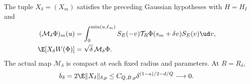 \begin{proposition}
  \label{P:tube-actual-law}
  The tuple $X_\delta=(X_m)$ satisfies the preceding Gaussian
  hypotheses with $H=H_I$ and
  \begin{align}
    (\mathcal M_\delta\Phi)_m(u)
    &=\int_0^{\min(u,\ell_m)}
    S_E(-v)\mathcal T_R\Phi(s_m+\delta v)S_E(v)\ud v,
    \label{E:tube-actual-mean}\\
    \E[X_\delta W(\Phi)]&=\sqrt\delta\,\mathcal M_\delta\Phi .
    \label{E:tube-actual-covariance}
  \end{align}
  The actual map $\mathcal M_\delta$ is compact at each fixed radius
  and parameters. At $R=R_\delta$,
  \begin{equation}\label{E:tube-typical-radius}
    b_\delta=2\E\|X_\delta\|_{\delta,p}
    \le C_{Q,B,p}\delta^{(1-a)/2-d/Q}\longrightarrow0 .
  \end{equation}
\end{proposition}

